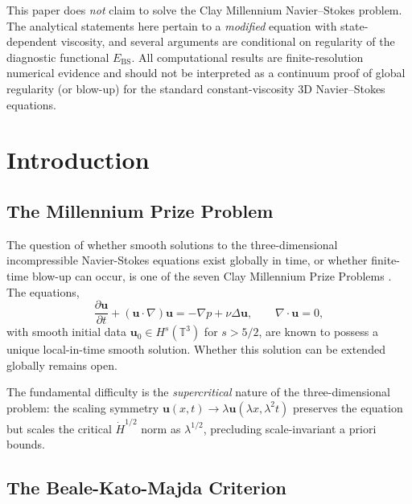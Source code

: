 \documentclass[12pt, a4paper]{article}
\newcommand{\T}{\mathbb{T}}
\newcommand{\pd}[2]{\frac{\partial #1}{\partial #2}}
\newcommand{\Ebs}{E_{\mathrm{BS}}}
\begin{document}
\begin{tcolorbox}[colback=gray!5,colframe=gray!50,title=Scope and non-claims]
This paper does \emph{not} claim to solve the Clay Millennium Navier--Stokes problem.
The analytical statements here pertain to a \emph{modified} equation with
state-dependent viscosity, and several arguments are conditional on regularity
of the diagnostic functional $\Ebs$.
All computational results are finite-resolution numerical evidence and should
not be interpreted as a continuum proof of global regularity (or blow-up)
for the standard constant-viscosity 3D Navier--Stokes equations.
\end{tcolorbox}

\tableofcontents
\newpage

\section{Introduction}\label{sec:intro}

\subsection{The Millennium Prize Problem}

The question of whether smooth solutions to the three-dimensional
incompressible Navier-Stokes equations exist globally in time,
or whether finite-time blow-up can occur, is one of the seven
Clay Millennium Prize Problems \cite{fefferman2006}.
The equations,
\begin{equation}\label{eq:NS}
\pd{\mathbf{u}}{t} + (\mathbf{u} \cdot \nabla)\mathbf{u}
= -\nabla p + \nu \Delta \mathbf{u}, \qquad
\nabla \cdot \mathbf{u} = 0,
\end{equation}
with smooth initial data $\mathbf{u}_0 \in H^s(\T^3)$ for $s > 5/2$,
are known to possess a unique local-in-time smooth solution.
Whether this solution can be extended globally remains open.

The fundamental difficulty is the \emph{supercritical} nature of the
three-dimensional problem: the scaling symmetry
$\mathbf{u}(x,t) \to \lambda \mathbf{u}(\lambda x, \lambda^2 t)$
preserves the equation but scales the critical $\dot{H}^{1/2}$ norm
as $\lambda^{1/2}$, precluding scale-invariant a priori bounds.

\subsection{The Beale-Kato-Majda Criterion}
\end{document}
